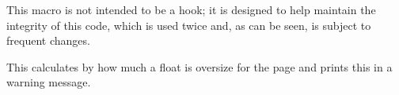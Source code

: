  \begin{macro}{\end@dblfloat}
    \begin{teX}
\def\end@dblfloat{%
\if@twocolumn
  \@endfloatbox
  \ifnum\@floatpenalty <\z@
    \end{teX}
 We make sure that we never exceed |\textheight|, otherwise float
 will never get typeset (91/03/15 FMi).
    \begin{teX}
    \@largefloatcheck
    \@cons\@dbldeferlist\@currbox
  \fi
    \end{teX}
 RmS 92/03/18 changed |\@esphack| to |\@Esphack|.
    \begin{teX}
    \ifnum \@floatpenalty =-\@Mii \@Esphack\fi
\else
  \end@float
\fi
}
    \end{teX}
 \end{macro}
 
 \begin{macro}{\@endfloatbox}
    This macro is not intended to be a hook; it is designed to help
    maintain the integrity of this code, which is used twice and, as
    can be seen, is subject to frequent changes.
    \begin{teX}
\def \@endfloatbox{%
      \par\vskip\z@skip      %
    \end{teX}
   
    \begin{teX}
      \@minipagefalse   
      \outer@nobreak
    \egroup                  %
  \color@endbox
}
% 
 \begin{macro}{\outer@nobreak}
    \begin{teX}
\let\outer@nobreak\@empty
    \end{teX}
  \end{macro}
 

  \begin{macro}{\@largefloatcheck}
 
    This calculates by how much a float is oversize for the page and
    prints this in a warning message.
    
    \begin{teX}  
\def \@largefloatcheck{%
  \ifdim \ht\@currbox>\textheight
    \@tempdima -\textheight
    \advance \@tempdima \ht\@currbox
    \end{teX}

    \begin{teX}
    \@latex@warning {Float too large for page by \the\@tempdima}%
    \ht\@currbox \textheight
  \fi
}
    \end{teX}
  \end{macro}


\end{teX}
\end{macro}
